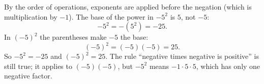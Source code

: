 By the order of operations, exponents are applied before the negation (which is multiplication by $-1$). The base of the power in $-5^2$ is $5$, not $-5$:
\[
-5^2=-(5^2)=-25 .
\]
In $(-5)^2$ the parentheses make $-5$ the base:
\[
(-5)^2=(-5)(-5)=25 .
\]
So $-5^2=\boxed{-25}$ and $(-5)^2=\boxed{25}$. The rule ``negative times negative is positive'' is still true; it applies to $(-5)(-5)$, but $-5^2$ means $-1\cdot5\cdot5$, which has only one negative factor.

